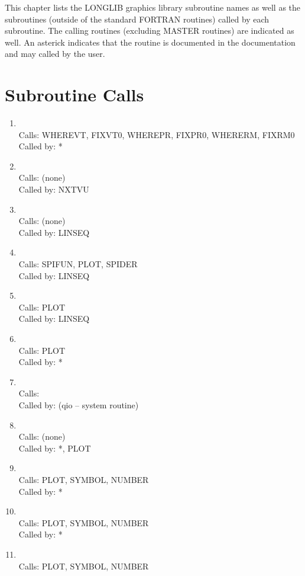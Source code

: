 \documentclass[11pt]{report}
\begin{document}
This chapter lists the LONGLIB graphics library subroutine names as well
as the subroutines (outside of the standard FORTRAN routines) called by
each subroutine.  The calling routines (excluding MASTER routines) are
indicated as well.  An asterick
indicates that the routine is documented in the documentation and may
called by the user.

\section{Subroutine Calls}
\begin{enumerate}
\footnotesize
\item {}
\\ Calls:  WHEREVT, FIXVT0, WHEREPR, FIXPR0, WHERERM, FIXRM0
\\ Called by: *
\item {}
\\ Calls:  (none)
\\ Called by: NXTVU
\item {}
\\ Calls:  (none)
\\ Called by: LINSEQ
\item {}
\\ Calls:  SPIFUN, PLOT, SPIDER 
\\ Called by: LINSEQ
\item {}
\\ Calls:  PLOT
\\ Called by: LINSEQ
\item {}
\\ Calls:  PLOT
\\ Called by: *
\item {}
\\ Calls:
\\ Called by: (qio -- system routine)
\item {}
\\ Calls: (none)
\\ Called by: *, PLOT
\item {}
\\ Calls:  PLOT, SYMBOL, NUMBER
\\ Called by: *
\item {}
\\ Calls:  PLOT, SYMBOL, NUMBER
\\ Called by: *
\item {}
\\ Calls:  PLOT, SYMBOL, NUMBER

\end{enumerate}
\end{document}
